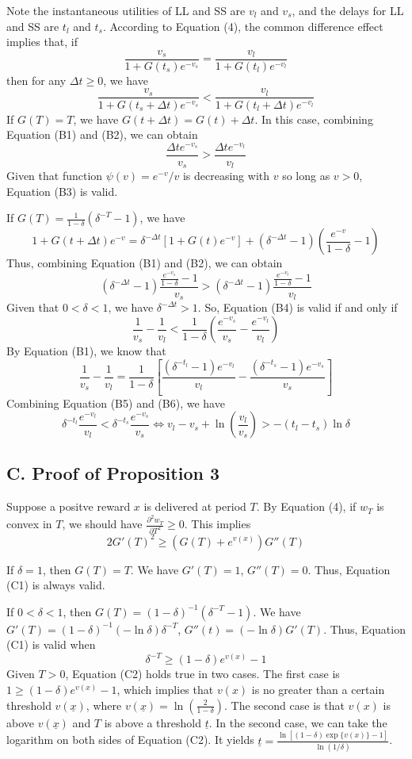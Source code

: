 \documentclass[
  12pt,
]{article}
\begin{document}
Note the instantaneous utilities of LL and SS are \(v_l\) and \(v_s\),
and the delays for LL and SS are \(t_l\) and \(t_s\). According to
Equation (4), the common difference effect implies that, if\[ \tag{B1}
\frac{v_s}{1+G(t_s)e^{-v_s}} = \frac{v_l}{1+G(t_l)e^{-v_l}}
\]then for any \(\Delta t \geq 0\), we have \[ \tag{B2}
\frac{v_s}{1+G(t_s+\Delta t)e^{-v_s}} < \frac{v_l}{1+G(t_l+\Delta t)e^{-v_l}}
\]If \(G(T)=T\), we have \(G(t+\Delta t) = G(t) + \Delta t\). In this
case, combining Equation (B1) and (B2), we can obtain\[ \tag{B3}
\frac{\Delta t e^{-v_s}}{v_s} > \frac{\Delta t e^{-v_l}}{v_l}
\]Given that function \(\psi(v) = e^{-v}/v\) is decreasing with \(v\) so
long as \(v>0\), Equation (B3) is valid.

If \(G(T) = \frac{1}{1-\delta}(\delta^{-T}-1)\), we have\[
1+G(t+\Delta t)e^{-v} = \delta^{-\Delta t}[1+G(t)e^{-v}]+(\delta^{-\Delta t}-1)(\frac{e^{-v}}{1-\delta}-1)
\] Thus, combining Equation (B1) and (B2), we can obtain\[\tag{B4}
(\delta^{-\Delta t}-1)\frac{\frac{e^{-v_s}}{1-\delta}-1}{v_s} >
(\delta^{-\Delta t}-1)\frac{\frac{e^{-v_l}}{1-\delta}-1}{v_l}
\] Given that \(0<\delta<1\), we have \(\delta^{-\Delta t}>1\). So,
Equation (B4) is valid if and only if\[\tag{B5}
\frac{1}{v_s}-\frac{1}{v_l}<\frac{1}{1-\delta}(\frac{e^{-v_s}}{v_s}-\frac{e^{-v_l}}{v_l})
\] By Equation (B1), we know that\[\tag{B6}
\frac{1}{v_s}-\frac{1}{v_l}=\frac{1}{1-\delta}\left[\frac{(\delta^{-t_l}-1)e^{-v_l}}{v_l} -\frac{(\delta^{-t_s}-1)e^{-v_s}}{v_s}\right]
\] Combining Equation (B5) and (B6), we have\[
\delta^{-t_l}\frac{e^{-v_l}}{v_l}<\delta^{-t_s}\frac{e^{-v_s}}{v_s} \Longleftrightarrow v_l - v_s + \ln \left(\frac{v_l}{v_s}\right)>-(t_l-t_s)\ln\delta
\]

\hypertarget{c.-proof-of-proposition-3}{%
\subsection*{C. Proof of Proposition
3}\label{c.-proof-of-proposition-3}}

Suppose a positve reward \(x\) is delivered at period \(T\). By Equation
(4), if \(w_T\) is convex in \(T\), we should have
\(\frac{\partial^2 w_T}{\partial T^2}\geq 0\). This
implies\[\tag{C1} 2G'(T)^2\geq(G(T)+e^{v(x)})G''(T) \]

If \(\delta=1\), then \(G(T)=T\). We have \(G'(T)=1\), \(G''(T)=0\).
Thus, Equation (C1) is always valid.

If \(0<\delta<1\), then \(G(T)=(1-\delta)^{-1}(\delta^{-T}-1)\). We have
\(G'(T)=(1-\delta)^{-1}(-\ln\delta)\delta^{-T}\),
\(G''(t)=(-\ln\delta)G'(T)\). Thus, Equation (C1) is valid when
\[\tag{C2} \delta^{-T}\geq(1-\delta)e^{v(x)}-1 \]Given \(T>0\), Equation
(C2) holds true in two cases. The first case is
\(1\geq (1-\delta)e^{v(x)}-1\), which implies that \(v(x)\) is no
greater than a certain threshold \(v(\underline{x})\), where
\(v(\underline{x})=\ln(\frac{2}{1-\delta})\). The second case is that
\(v(x)\) is above \(v(\underline{x})\) and \(T\) is above a threshold
\(\underline{t}\). In the second case, we can take the logarithm on both
sides of Equation (C2). It yields
\(\underline{t}=\frac{\ln[(1-\delta)\exp\{v(x)\}-1]}{\ln(1/\delta)}\).
\end{document}
